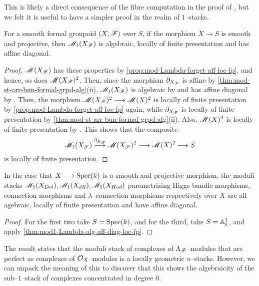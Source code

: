\documentclass[11pt]{amsart}
\begin{document}
\begin{rmk}
This is likely a direct consequence of the fibre computation in the proof of
\cite[Theorem 6.13]{GeomNonAbHodgeFilt}, but we felt it is useful to have
a simpler proof in the realm of $1$--stacks.
\end{rmk}

\begin{thm}\label{thm:mod1-Lambda-alg-aff-diag-loc-fp}
For a smooth formal groupoid $(X, \mathscr{F})$ over $S$, if the morphism
$X \to S$ is smooth and projective, then $\mathscr{M}_1(X_\mathscr{F})$ is algebraic, locally of
finite presentation and has affine diagonal.
\end{thm}
\begin{proof}
$\mathscr{M}(X_\mathscr{F})$ has these properties by \cref{prop:mod-Lambda-forget-aff-loc-fp},
and hence, so does $\mathscr{M}(X_\mathscr{F})^2$. Then, since the morphism $\partial_{X_\mathscr{F}}$
is affine by \cref{thm:mod-st-arr-bun-formal-grpd-alg}(ii), $\mathscr{M}_1(X_\mathscr{F})$
is algebraic by
\cite[\href{https://stacks.math.columbia.edu/tag/05UM}{Lemma 05UM}]
{stacks-project} and has affine diagonal by \cite[Lemma 4.9]{ModQuivBun}.
Then, the morphism $\sM(X_\sF)^2 \to \sM(X)^2$ is locally of finite presentation
by \cref{prop:mod-Lambda-forget-aff-loc-fp} again, while
$\partial_{X_\mathscr{F}}$ is locally of finite presentation by
\cref{thm:mod-st-arr-bun-formal-grpd-alg}(ii). Also,
$\mathscr{M}(X)^2$ is locally of finite presentation by \cite[Theorem 1.0.1]{Wang-BunG}.
This shows that the composite
\[
\sM_1(X_\sF) \to[\partial_{X_\sF}] \sM(X_\sF)^2 \to \sM(X)^2 \to S
\]
is locally of finite presentation.
\end{proof}

\begin{thm}\label{thm:mod-st-conn-alg-lfp-aff-diag}
In the case that $X \to \Spec(k)$ is a smooth and projective morphism,
the moduli stacks
$\mathscr{M}_1(X_{Dol}), \mathscr{M}_1(X_{dR}), \mathscr{M}_1(X_{Hod})$ parametrizing
Higgs bundle morphisms, connection morphisms and $\lambda$--connection
morphisms respectively over $X$ are all agebraic, locally of finite presentation
and have affine diagonal.
\end{thm}
\begin{proof}
For the first two take $S = \mathrm{Spec}(k)$, and for the third, take
$S = \mathbb{A}^1_k$, and apply \cref{thm:mod1-Lambda-alg-aff-diag-loc-fp}.
\end{proof}

\begin{rmk}
The result \cite[Theorem 6.13]{GeomNonAbHodgeFilt} states that the moduli
stack of complexes of $\Lambda_\mathscr{F}$--modules that are perfect as complexes
of $\mathcal{O}_X$--modules is a locally geometric $n$--stacks. However, we can unpack
the meaning of this to discover that this shows the algebraicity of the
sub--$1$--stack of complexes concentrated in degree $0$.
\end{rmk}
\end{document}
